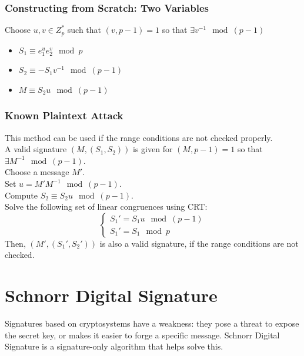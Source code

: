 \documentclass{report}
\begin{document}
			\subsubsection{Constructing from Scratch: Two Variables}
				Choose $u,v\in Z_p^*$ such that $(v,p-1)=1$ so that $\exists v^{-1} \mod(p-1)$
				\begin{itemize}
					\item $S_1 \equiv e_1^ue_2^v \mod p$
					\item $S_2 \equiv -S_1v^{-1} \mod (p-1)$
					\item $M \equiv S_2u \mod(p-1)$
				\end{itemize}
		
			\subsubsection{Known Plaintext Attack}
				This method can be used if the range conditions are not checked properly.\\
				A valid signature $(M,(S_1,S_2))$ is given for $(M,p-1)=1$ so that  $\exists M^{-1} \mod (p-1)$.\\
				Choose a message $M'$.\\
				Set $u=M'M^{-1} \mod (p-1)$.\\
				Compute $S_2 \equiv S_2u \mod (p-1)$.\\
				Solve the following set of linear congruences using CRT:
				\begin{displaymath}
				\begin{cases}
				S_1'=S_1u \mod(p-1)\\
				S_1'=S_1 \mod p
				\end{cases}
				\end{displaymath}
				Then, $(M',(S_1',S_2'))$ is also a valid signature, if the range conditions are not checked.
		
	\section{Schnorr Digital Signature}
		Signatures based on cryptosystems have a weakness: they pose a threat to expose the secret key, or makes it easier to forge a specific message. Schnorr Digital Signature is a signature-only algorithm that helps solve this.
\end{document}
